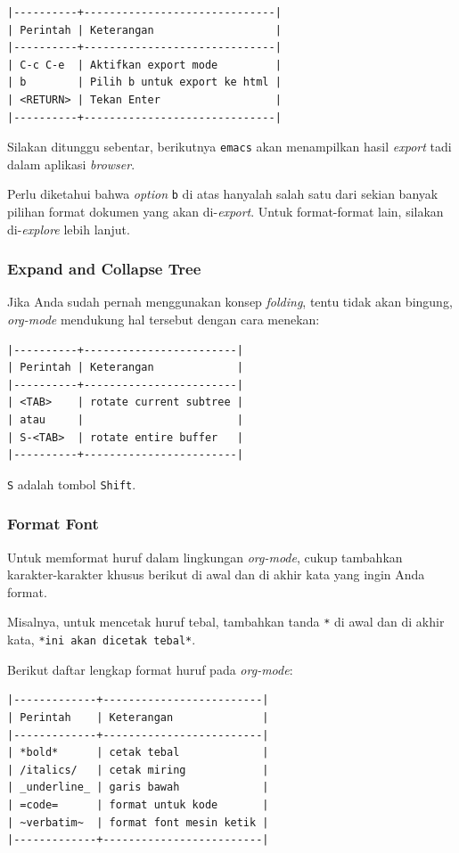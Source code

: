 \documentclass{article}
\begin{document}
\begin{verbatim}
|----------+------------------------------|
| Perintah | Keterangan                   |
|----------+------------------------------|
| C-c C-e  | Aktifkan export mode         |
| b        | Pilih b untuk export ke html |
| <RETURN> | Tekan Enter                  |
|----------+------------------------------|
\end{verbatim}

Silakan ditunggu sebentar, berikutnya \verb=emacs= akan menampilkan hasil
\emph{export} tadi dalam aplikasi \emph{browser}.

Perlu diketahui bahwa \emph{option} \verb=b= di atas hanyalah salah satu dari
sekian banyak pilihan format dokumen yang akan di-\emph{export}. Untuk 
format-format lain, silakan di-\emph{explore} lebih lanjut.

\subsubsection{Expand and Collapse Tree}
Jika Anda sudah pernah menggunakan konsep \emph{folding}, tentu tidak akan
bingung, \emph{org-mode} mendukung hal tersebut dengan cara menekan:

\begin{verbatim}
|----------+------------------------|
| Perintah | Keterangan             |
|----------+------------------------|
| <TAB>    | rotate current subtree |
| atau     |                        |
| S-<TAB>  | rotate entire buffer   |
|----------+------------------------|
\end{verbatim}

\verb=S= adalah tombol \verb=Shift=.

\subsubsection{Format Font}
Untuk memformat huruf dalam lingkungan \emph{org-mode}, cukup tambahkan
karakter-karakter khusus berikut di awal dan di akhir kata yang ingin 
Anda format.

Misalnya, untuk mencetak huruf tebal, tambahkan tanda \verb=*= di awal
dan di akhir kata, \verb=*ini akan dicetak tebal*=.

Berikut daftar lengkap format huruf pada \emph{org-mode}:

\begin{verbatim}
|-------------+-------------------------|
| Perintah    | Keterangan              |
|-------------+-------------------------|
| *bold*      | cetak tebal             |
| /italics/   | cetak miring            |
| _underline_ | garis bawah             |
| =code=      | format untuk kode       |
| ~verbatim~  | format font mesin ketik |
|-------------+-------------------------|
\end{verbatim}
\end{document}
